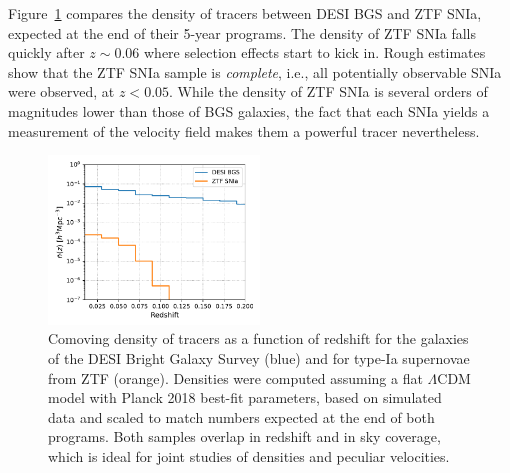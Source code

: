 Figure~\ref{fig:nz_desi_ztf} compares the density of tracers between DESI BGS and ZTF SNIa, expected at 
the end of their 5-year programs. The density of ZTF SNIa falls quickly after $z \sim 0.06$ where 
selection effects start to kick in. Rough estimates show that the ZTF SNIa sample is \emph{complete},
i.e., all potentially observable SNIa were observed, at $z < 0.05$. 
While the density of ZTF SNIa is several orders of magnitudes lower 
than those of BGS galaxies, the fact that each SNIa yields a measurement of the velocity field 
makes them a powerful tracer nevertheless. 

\begin{figure}
    \centering
    \includegraphics[width=0.5\textwidth]{fig/velocities/nz_desi_ztf.pdf}
    \caption{Comoving density of tracers as a function of redshift for the galaxies of 
    the DESI Bright Galaxy Survey (blue) and for type-Ia supernovae from ZTF (orange).
    Densities were computed assuming a flat $\Lambda$CDM model with 
    Planck 2018 best-fit parameters, based on simulated data and scaled to 
    match numbers expected at the end of both programs. 
    Both samples overlap in redshift and in sky coverage, which is ideal for joint studies 
    of densities and peculiar velocities. 
    }
    \label{fig:nz_desi_ztf}
\end{figure}


